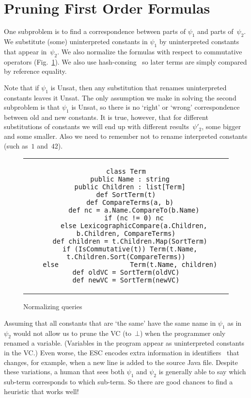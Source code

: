 \documentclass{llncs}
\def\unsat{{\sc Unsat}}
\def\false{\bot}
\begin{document}
\section{Pruning First Order Formulas}
\label{sec:prune}

One subproblem is to find a correspondence between parts
of $\psi_1$ and parts of~$\psi_2$. We substitute (some) 
uninterpreted constants in $\psi_1$ by uninterpreted 
constants that appear in~$\psi_2$. We also normalize
the formulas with respect to commutative operators
(Fig.~\ref{fig:alg_sort}). We also use 
hash-consing~\cite{hashcons_old,hashcons_ml} so later terms 
are simply compared by reference equality.

Note that if $\psi_1$ is \unsat, then any
substitution that renames uninterpreted constants leaves it \unsat.
The only assumption we make in solving the second subproblem
is that $\psi_1$ is \unsat, so there is no `right' or `wrong'
correspondence between old and new constants. It is true, 
however, that for different substitutions of constants we 
will end up with different results~$\psi'_2$, some bigger 
and some smaller. Also we need to remember not to rename 
interpreted constants (such as~$1$ and~$42$).

\begin{figure}[t]
  \centering
\begin{tabular}{c}
\begin{lstlisting}
class Term
  public Name : string
  public Children : list[Term]
def SortTerm(t)
  def CompareTerms(a, b)
    def nc = a.Name.CompareTo(b.Name)
    if (nc != 0) nc
    else LexicographicCompare(a.Children, b.Children, CompareTerms)
  def children = t.Children.Map(SortTerm)
  if (IsCommutative(t)) Term(t.Name, t.Children.Sort(CompareTerms))
  else                  Term(t.Name, children)
def oldVC = SortTerm(oldVC)
def newVC = SortTerm(newVC)
\end{lstlisting}
\end{tabular}
  \caption{Normalizing queries}
  \label{fig:alg_sort}
\end{figure}

Assuming that all constants that are `the same' have the 
same name in $\psi_1$ as in $\psi_2$ would not allow us 
to prune the VC (to~$\false$) when the programmer only 
renamed a variable. (Variables in the program appear as
uninterpreted constants in the VC.) Even worse, the ESC encodes extra 
information in identifiers~\cite{leino2005get} that changes, 
for example, when a new line is added to the source Java file. 
Despite these variations, a human that sees both $\psi_1$ and 
$\psi_2$ is generally able to say which sub-term corresponds 
to which sub-term. So there are good chances to find a heuristic 
that works well!
\end{document}
